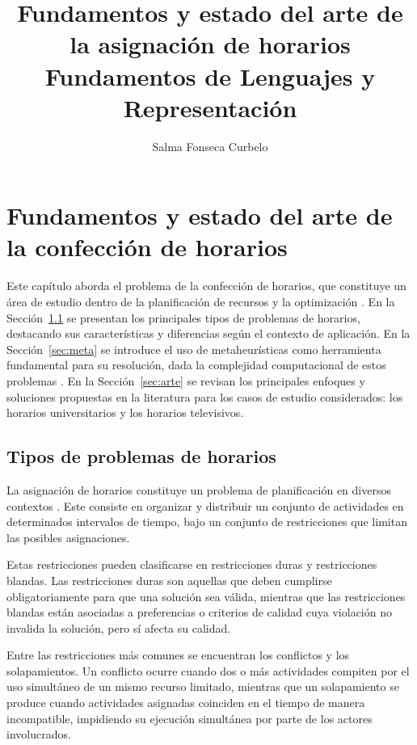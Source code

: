 \documentclass{article}
\title{Fundamentos y estado del arte de la asignación de horarios \\
        \large Fundamentos de Lenguajes y Representación}
\author{Salma Fonseca Curbelo}
\date{}
\begin{document}
\maketitle

\section{Fundamentos y estado del arte de la confección de horarios}

Este capítulo aborda el problema de la confección de horarios, que constituye un área de estudio dentro de la planificación de recursos y la optimización \cite{babaei2015}. En la Sección~\ref{sec:tipos} se presentan los principales tipos de problemas de horarios, destacando sus características y diferencias según el contexto de aplicación. En la Sección~\ref{sec:meta} se introduce el uso de metaheurísticas como herramienta fundamental para su resolución, dada la complejidad computacional de estos problemas \cite{karp1972}. En la Sección~\ref{sec:arte} se revisan los principales enfoques y soluciones propuestas en la literatura para los casos de estudio considerados: los horarios universitarios y los horarios televisivos.

\subsection{Tipos de problemas de horarios}
\label{sec:tipos}

La asignación de horarios constituye un problema de planificación en diversos contextos \cite{babaei2015}. Este consiste en organizar y distribuir un conjunto de actividades en determinados intervalos de tiempo, bajo un conjunto de restricciones que limitan las posibles asignaciones.

Estas restricciones pueden clasificarse en restricciones duras y restricciones blandas. Las restricciones duras son aquellas que deben cumplirse obligatoriamente para que una solución sea válida, mientras que las restricciones blandas están asociadas a preferencias o criterios de calidad cuya violación no invalida la solución, pero sí afecta su calidad.

Entre las restricciones más comunes se encuentran los conflictos y los solapamientos. Un conflicto ocurre cuando dos o más actividades compiten por el uso simultáneo de un mismo recurso limitado, mientras que un solapamiento se produce cuando actividades asignadas coinciden en el tiempo de manera incompatible, impidiendo su ejecución simultánea por parte de los actores involucrados.
\end{document}
